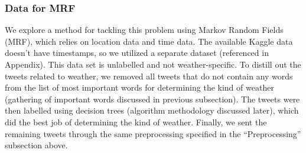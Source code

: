 \subsubsection{Data for MRF}
	We explore a method for tackling this problem using Markov Random Fields (MRF), which relies on location data and time data. The available Kaggle data doesn't have timestamps, so we utilized a separate dataset (referenced in Appendix). This data set is unlabelled and not weather-specific. To distill out the tweets related to weather, we removed all tweets that do not contain any words from the list of most important words for determining the kind of weather (gathering of important words discussed in previous subsection). The tweets were then labelled using decision trees (algorithm methodology discussed later), which did the best job of determining the kind of weather. Finally, we sent the remaining tweets through the same preprocessing specified in the ``Preprocessing'' subsection above.